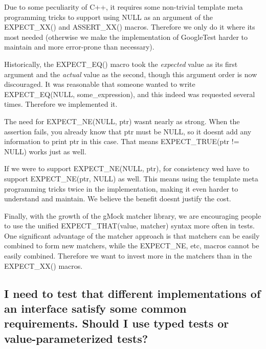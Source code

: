 Due to some peculiarity of C++, it requires some non-\/trivial template meta programming tricks to support using {\ttfamily N\+U\+LL} as an argument of the {\ttfamily E\+X\+P\+E\+C\+T\+\_\+\+X\+X()} and {\ttfamily A\+S\+S\+E\+R\+T\+\_\+\+X\+X()} macros. Therefore we only do it where it\textquotesingle{}s most needed (otherwise we make the implementation of Google\+Test harder to maintain and more error-\/prone than necessary).

Historically, the {\ttfamily E\+X\+P\+E\+C\+T\+\_\+\+E\+Q()} macro took the {\itshape expected} value as its first argument and the {\itshape actual} value as the second, though this argument order is now discouraged. It was reasonable that someone wanted to write {\ttfamily E\+X\+P\+E\+C\+T\+\_\+\+E\+Q(\+N\+U\+L\+L, some\+\_\+expression)}, and this indeed was requested several times. Therefore we implemented it.

The need for {\ttfamily E\+X\+P\+E\+C\+T\+\_\+\+N\+E(\+N\+U\+L\+L, ptr)} wasn\textquotesingle{}t nearly as strong. When the assertion fails, you already know that {\ttfamily ptr} must be {\ttfamily N\+U\+LL}, so it doesn\textquotesingle{}t add any information to print {\ttfamily ptr} in this case. That means {\ttfamily E\+X\+P\+E\+C\+T\+\_\+\+T\+R\+UE(ptr != N\+U\+LL)} works just as well.

If we were to support {\ttfamily E\+X\+P\+E\+C\+T\+\_\+\+N\+E(\+N\+U\+L\+L, ptr)}, for consistency we\textquotesingle{}d have to support {\ttfamily E\+X\+P\+E\+C\+T\+\_\+\+N\+E(ptr, N\+U\+L\+L)} as well. This means using the template meta programming tricks twice in the implementation, making it even harder to understand and maintain. We believe the benefit doesn\textquotesingle{}t justify the cost.

Finally, with the growth of the g\+Mock matcher library, we are encouraging people to use the unified {\ttfamily E\+X\+P\+E\+C\+T\+\_\+\+T\+H\+A\+T(value, matcher)} syntax more often in tests. One significant advantage of the matcher approach is that matchers can be easily combined to form new matchers, while the {\ttfamily E\+X\+P\+E\+C\+T\+\_\+\+NE}, etc, macros cannot be easily combined. Therefore we want to invest more in the matchers than in the {\ttfamily E\+X\+P\+E\+C\+T\+\_\+\+X\+X()} macros.

\subsection*{I need to test that different implementations of an interface satisfy some common requirements. Should I use typed tests or value-\/parameterized tests?}


